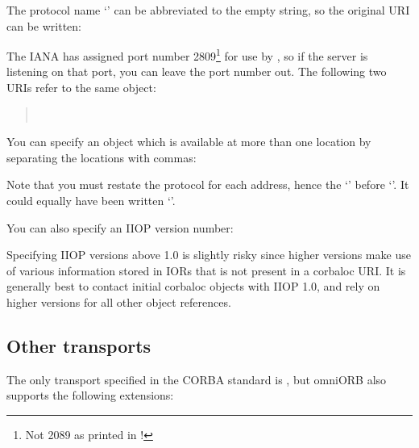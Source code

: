 \documentclass[11pt,oneside,a4paper]{book}
\begin{document}
The protocol name `' can be abbreviated to the empty
string, so the original URI can be written:

\begin{quote}
\end{quote}

\noindent The IANA has assigned port number 2809\footnote{Not 2089 as
printed in \cite{inschapters}!} for use by , so if
the server is listening on that port, you can leave the port number
out.  The following two URIs refer to the same object:

\begin{quote}
\\
\end{quote}

\noindent You can specify an object which is available at more than
one location by separating the locations with commas:

\begin{quote}
\end{quote}

\noindent Note that you must restate the protocol for each address,
hence the `\corbauri{:}' before `'. It could
equally have been written `'.

You can also specify an IIOP version number:

\begin{quote}
\end{quote}

\noindent Specifying IIOP versions above 1.0 is slightly risky since
higher versions make use of various information stored in IORs that is
not present in a corbaloc URI. It is generally best to contact initial
corbaloc objects with IIOP 1.0, and rely on higher versions for all
other object references.



\subsection{Other transports}

The only transport specified in the CORBA standard is ,
but omniORB also supports the following extensions:
\end{document}
